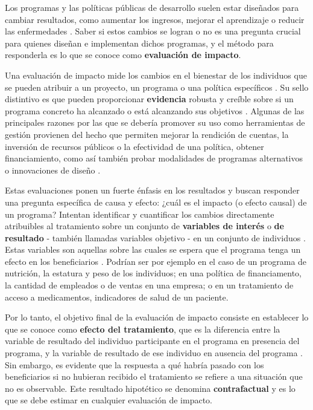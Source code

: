 \documentclass[../../main.tex]{subfiles}
\begin{document}
Los programas y las políticas públicas de desarrollo suelen estar diseñados para cambiar
resultados, como aumentar los ingresos, mejorar el aprendizaje o reducir las enfermedades
\cite{gertler-2016}. Saber si estos cambios se logran o no es una pregunta crucial para
quienes diseñan e implementan dichos programas, y el método para responderla es lo que se
conoce como \textbf{evaluación de impacto}.

Una evaluación de impacto mide los cambios en el bienestar de los individuos que se pueden
atribuir a un proyecto, un programa o una política específicos \cite{gertler-2016}. Su
sello distintivo es que pueden proporcionar \textbf{evidencia} robusta y creíble sobre si
un programa concreto ha alcanzado o está alcanzando sus objetivos \cite{gertler-2016}.
Algunas de las principales razones por las que se debería promover su uso como
herramientas de gestión provienen del hecho que permiten mejorar la rendición de cuentas,
la inversión de recursos públicos o la efectividad de una política, obtener
financiamiento, como así también probar modalidades de programas alternativos o
innovaciones de diseño \cite{gertler-2016}.

Estas evaluaciones ponen un fuerte énfasis en los resultados y buscan responder una
pregunta específica de causa y efecto: ¿cuál es el impacto (o efecto causal) de un
programa? Intentan identificar y cuantificar los cambios directamente atribuibles al
tratamiento \cite{gertler-2016} sobre un conjunto de \textbf{variables de interés} o
\textbf{de resultado} - también llamadas variables objetivo - en un conjunto de individuos
\cite{bernal}. Estas variables son aquellas sobre las cuales se espera que el programa
tenga un efecto en los beneficiarios \cite{bernal}. Podrían ser por ejemplo en el caso de
un programa de nutrición, la estatura y peso de los individuos; en una política de
financiamento, la cantidad de empleados o de ventas en una empresa; o en un tratamiento de
acceso a medicamentos, indicadores de salud de un paciente.

Por lo tanto, el objetivo final de la evaluación de impacto consiste en establecer lo que
se conoce como \textbf{efecto del tratamiento}, que es la diferencia entre la variable de
resultado del individuo participante en el programa en presencia del programa, y la
variable de resultado de ese individuo en ausencia del programa \cite{bernal}. Sin
embargo, es evidente que la respuesta a qué habría pasado con los beneficiarios si no
hubieran recibido el tratamiento se refiere a una situación que no es observable. Este
resultado hipotético se denomina \textbf{contrafactual} y es lo que se debe estimar en
cualquier evaluación de impacto.
\end{document}
